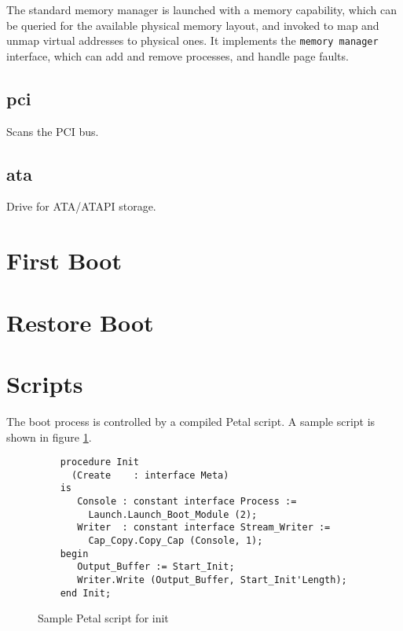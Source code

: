 The standard memory manager is launched with a memory capability, which can be queried for the available physical memory layout, and invoked to map and unmap virtual addresses to physical ones.  It implements the {\tt memory manager} interface, which can add and remove processes, and handle page faults.

\subsection{pci}

Scans the PCI bus.

\subsection{ata}

Drive for ATA/ATAPI storage.

\section{First Boot}

\section{Restore Boot}

\section{Scripts}

The boot process is controlled by a compiled Petal script.  A sample script is shown in figure {\ref{fig:init.petal}}.

\begin{figure}
    \centering
\begin{verbatim}
    procedure Init
      (Create    : interface Meta)
    is
       Console : constant interface Process :=
         Launch.Launch_Boot_Module (2);
       Writer  : constant interface Stream_Writer :=
         Cap_Copy.Copy_Cap (Console, 1);
    begin
       Output_Buffer := Start_Init;
       Writer.Write (Output_Buffer, Start_Init'Length);
    end Init;
\end{verbatim}
\caption{Sample Petal script for init}
    \label{fig:init.petal}
\end{figure}

